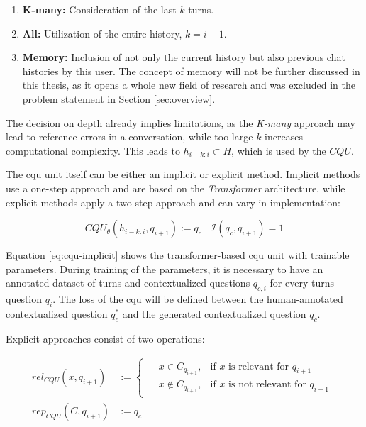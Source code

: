 \begin{enumerate}
    \item \textbf{K-many:} Consideration of the last $k$ turns.
    \item \textbf{All:} Utilization of the entire history, $k = i - 1$.
    \item \textbf{Memory:} Inclusion of not only the current history but also previous chat histories by this user. The concept of memory will not be further discussed in this thesis, as it opens a whole new field of research and was excluded in the problem statement in Section \ref{sec:overview}.
\end{enumerate}

The decision on depth already implies limitations, as the \textit{K-many} approach may lead to reference errors in a conversation, while too large $k$ increases computational complexity. This leads to $h_{i-k:i} \subset H$, which is used by the $CQU$.

The \gls{cqu} unit itself can be either an implicit or explicit method. Implicit methods use a one-step approach and are based on the \textit{Transformer} architecture, while explicit methods apply a two-step approach and can vary in implementation:

\begin{equation}
    CQU_{\theta}(h_{i-k:i}, q_{i+1}) := q_c \mid \mathcal{I}(q_c, q_{i+1}) = 1 
    \label{eq:cqu-implicit} 
\end{equation}

Equation \ref{eq:cqu-implicit} shows the transformer-based \gls{cqu} unit with trainable parameters. During training of the parameters, it is necessary to have an annotated dataset of turns and contextualized questions $q_{c,i}$ for every turns question $q_i$. The loss of the \gls{cqu} will be defined between the human-annotated contextualized question $q_c^*$ and the generated contextualized question $q_c$.

Explicit approaches consist of two operations:

\begin{align}
    rel_{CQU}(x, q_{i+1}) &:= 
    \begin{cases}
        \begin{aligned}
            & x \in C_{q_{i+1}}, & \text{if } x \text{ is relevant for } q_{i+1}\\
            & x \not\in C_{q_{i+1}}, & \text{if }  x \text{ is not relevant for } q_{i+1}
        \end{aligned}
    \end{cases} \\
    rep_{CQU}(C, q_{i+1}) &:= q_c
\end{align}

